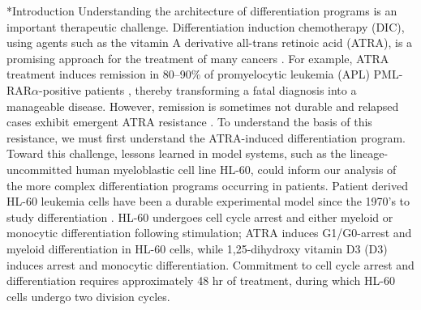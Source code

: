 \documentclass[12pt]{article}
\makeatletter
\renewcommand\section{\@startsection
	{subsection}{2}{0mm}
	{-0.2in}
	{0.05\baselineskip}
	{\normalfont\large\bfseries}}
\makeatother
\begin{document}
\clearpage

\setcounter{page}{1}

\linenumbers

\section*{Introduction}
Understanding the architecture of differentiation programs is an important therapeutic challenge.
Differentiation induction chemotherapy (DIC), using agents such as the vitamin A derivative all-trans retinoic acid (ATRA),
is a promising approach for the treatment of many cancers \cite{Bushue:2010aa,Tang:2011aa,Cheung:2012aa}.
For example, ATRA treatment induces remission in 80–90\% of promyelocytic leukemia (APL) PML-RAR$\alpha$-positive patients \cite{Nilsson:1984aa}, thereby transforming a fatal diagnosis into a manageable disease.
However, remission is sometimes not durable and relapsed cases exhibit emergent ATRA resistance \cite{Warrell:1993aa,Freemantle:2003aa}.
To understand the basis of this resistance, we must first understand the ATRA-induced differentiation program.
Toward this challenge, lessons learned in model systems, such as the lineage-uncommitted human myeloblastic cell line HL-60, could inform our analysis of the more
complex differentiation programs occurring in patients. Patient derived HL-60 leukemia cells have been a durable experimental model since the 1970’s to study differentiation \cite{Breitman1980}.
HL-60 undergoes cell cycle arrest and either myeloid or monocytic differentiation following stimulation; ATRA induces G1/G0-arrest and myeloid differentiation in HL-60 cells,
while 1,25-dihydroxy vitamin D3 (D3) induces arrest and monocytic differentiation.
Commitment to cell cycle arrest and differentiation requires approximately 48 hr of treatment,
during which HL-60 cells undergo two division cycles.
\end{document}
